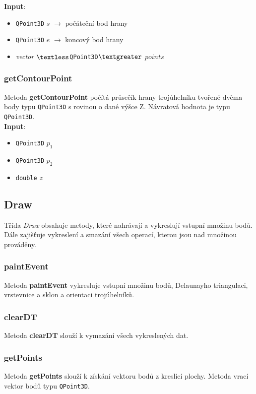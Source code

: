 \documentclass[a4paper, 12pt]{article}
\begin{document}
\textbf{Input}:
\begin{itemize}
\item \texttt{QPoint3D} $s$ $\rightarrow$ počáteční bod hrany
\item \texttt{QPoint3D} $e$ $\rightarrow$ koncový bod hrany
\item \textsl{vector} $\textless$\texttt{QPoint3D}$\textgreater$ $points$
\end{itemize}

\subsubsection*{getContourPoint}
Metoda \textbf{getContourPoint} počítá průsečík hrany trojúhelníku tvořené dvěma body typu \texttt{QPoint3D} s rovinou o dané výšce Z. Návratová hodnota je typu \texttt{QPoint3D}.\\

\textbf{Input}:
\begin{itemize}
\item \texttt{QPoint3D} $p_1$ 
\item \texttt{QPoint3D} $p_2$ 
\item \texttt{double} $z$ 
\end{itemize}

\subsection{Draw}
Třída \textit{Draw} obsahuje metody, které nahrávají a vykreslují vstupní množinu bodů. Dále zajišťuje vykreslení a smazání všech operací, kterou jsou nad množinou prováděny.

\subsubsection*{paintEvent}
Metoda \textbf{paintEvent} vykresluje vstupní množinu bodů, Delaunayho triangulaci, vrstevnice a sklon a orientaci trojúhelníků.

\subsubsection*{clearDT}
Metoda \textbf{clearDT} slouží k vymazání všech vykreslených dat.

\subsubsection*{getPoints}
Metoda \textbf{getPoints} slouží k získání vektoru bodů z kreslící plochy. Metoda vrací vektor bodů typu \texttt{QPoint3D}.
\end{document}
